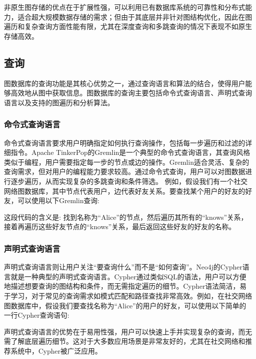 非原生图存储的优点在于扩展性强，可以利用已有数据库系统的可靠性和分布式能力，适合超大规模数据存储的需求；但由于其底层并非针对图结构优化，因此在图遍历和复杂查询方面性能有限，尤其在深度查询和多跳查询的情况下表现不如原生存储高效。
\vspace{1cm}
\subsection{查询}

图数据库的查询功能是其核心优势之一，通过查询语言和算法的结合，使得用户能够高效地从图中获取信息。图数据库的查询主要包括命令式查询语言、声明式查询语言以及支持的图遍历和分析算法。
\subsubsection*{命令式查询语言}

命令式查询语言要求用户明确指定如何执行查询操作，包括每一步遍历和过滤的详细指令。Apache TinkerPop的Gremlin是一个典型的命令式查询语言，其查询风格类似于编程，用户需要指定每一步的节点或边的操作。Gremlin适合灵活、复杂的查询需求，但对用户的编程能力要求较高。通过命令式查询，用户可以对图数据进行逐步遍历，从而实现复杂的多跳查询和条件筛选。
例如，假设我们有一个社交网络图数据库，其中节点代表用户，边代表好友关系。要查找某个用户的好友的好友，可以使用以下Gremlin查询:


这段代码的含义是: 找到名称为“Alice”的节点，然后遍历其所有的“knows”关系，接着再遍历这些好友节点的“knows”关系，最后返回这些好友的好友的名称。
\vspace{1cm}
\subsubsection*{声明式查询语言}

声明式查询语言则让用户关注“要查询什么”而不是“如何查询”。Neo4j的Cypher语言就是一种典型的声明式查询语言。Cypher通过类似SQL的语法，用户可以方便地描述想要查询的图结构和条件，而无需指定遍历的细节。Cypher语法简洁，易于学习，对于常见的查询需求如模式匹配和路径查找非常高效。例如，在社交网络图数据库中，假设我们要查找名称为“Alice”的用户的好友，可以使用以下简单的一行Cypher查询语句:


声明式查询语言的优势在于易用性强，用户可以快速上手并实现复杂的查询，而无需了解底层遍历细节。这对于大多数应用场景是非常友好的，尤其在社交网络和推荐系统中，Cypher被广泛应用。
\vspace{1cm}
